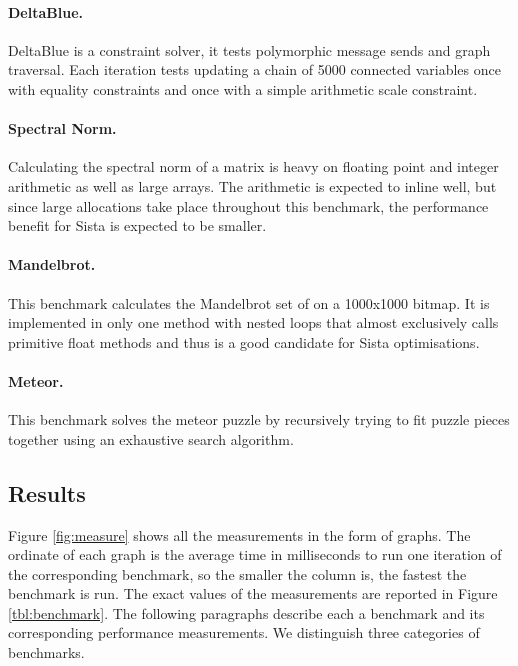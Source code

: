 \documentclass[a4paper,12pt,twoside]{../includes/ThesisStyle}
\begin{document}
	\paragraph{DeltaBlue.}DeltaBlue is a constraint solver, it tests polymorphic message sends and graph traversal. Each iteration tests updating a chain of 5000 connected variables once with equality constraints and once with a simple arithmetic scale constraint.

	\paragraph{Spectral Norm.}Calculating the spectral norm of a matrix is heavy on floating point and integer arithmetic as well as large arrays. The arithmetic is expected to inline well, but since large allocations take place throughout this benchmark, the performance benefit for Sista is expected to be smaller.

	\paragraph{Mandelbrot.}This benchmark calculates the Mandelbrot set of on a 1000x1000 bitmap. It is implemented in only one method with nested loops that almost exclusively calls primitive float methods and thus is a good candidate for Sista optimisations.

	\paragraph{Meteor.}This benchmark solves the meteor puzzle by recursively trying to fit puzzle pieces together using an exhaustive search algorithm.

\subsection{Results}

Figure \ref{fig:measure} shows all the measurements in the form of graphs. The ordinate of each graph is the average time in milliseconds to run one iteration of the corresponding benchmark, so the smaller the column is, the fastest the benchmark is run. The exact values of the measurements are reported in Figure \ref{tbl:benchmark}. The following paragraphs describe each a benchmark and its corresponding performance measurements. We distinguish three categories of benchmarks.
\end{document}
